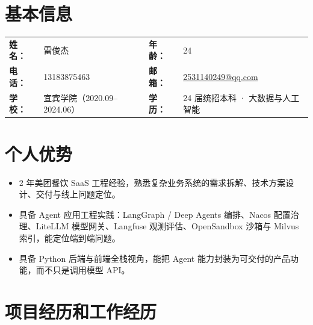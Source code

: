 \documentclass{resume-photo}
\begin{document}
\section{基本信息}

\noindent
\begin{tabularx}{\linewidth}{@{} l X l X @{}}
    \textbf{姓 名：} & 雷俊杰 & \textbf{年 龄：} & 24 \\
    \textbf{电 话：} & 13183875463 & \textbf{邮 箱：} & \href{mailto:2531140249@qq.com}{2531140249@qq.com} \\
    \textbf{学 校：} & 宜宾学院（2020.09--2024.06） & \textbf{学 历：} & 24 届统招本科 · 大数据与人工智能 \\
\end{tabularx}

\vspace{1pt}

\section{个人优势}
\begin{itemize}
  \item 2 年美团餐饮 SaaS 工程经验，熟悉复杂业务系统的需求拆解、技术方案设计、交付与线上问题定位。
  \item 具备 Agent 应用工程实践：LangGraph / Deep Agents 编排、Nacos 配置治理、LiteLLM 模型网关、Langfuse 观测评估、OpenSandbox 沙箱与 Milvus 索引，能定位端到端问题。
  \item 具备 Python 后端与前端全栈视角，能把 Agent 能力封装为可交付的产品功能，而不只是调用模型 API。
\end{itemize}

\section{项目经历和工作经历}
\end{document}
